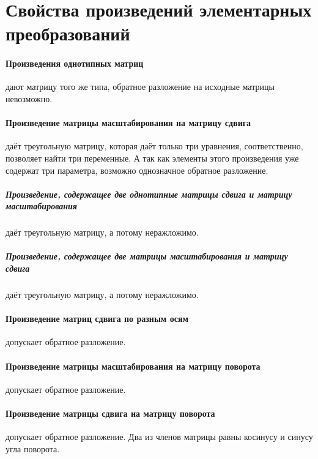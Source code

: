 \section{Свойства произведений элементарных преобразований}

\paragraph{Произведения однотипных матриц} дают матрицу того же типа, обратное разложение на исходные матрицы невозможно.

\paragraph{Произведение матрицы масштабирования на матрицу сдвига} даёт треугольную матрицу, которая даёт только три уравнения, соответственно, позволяет найти три переменные. А так как элементы этого произведения уже содержат три параметра, возможно однозначное обратное разложение.

\subparagraph{Произведение, содержащее две однотипные матрицы сдвига и матрицу масштабирования} даёт треугольную матрицу, а потому неражложимо.

\subparagraph{Произведение, содержащее две матрицы масштабирования и матрицу сдвига} даёт треугольную матрицу, а потому неражложимо.

\paragraph{Произведение матриц сдвига по разным осям} допускает обратное разложение.

\paragraph{Произведение матрицы масштабирования на матрицу поворота} допускает обратное разложение.

\paragraph{Произведение матрицы сдвига на матрицу поворота} допускает обратное разложение. Два из членов матрицы равны косинусу и синусу угла поворота.

